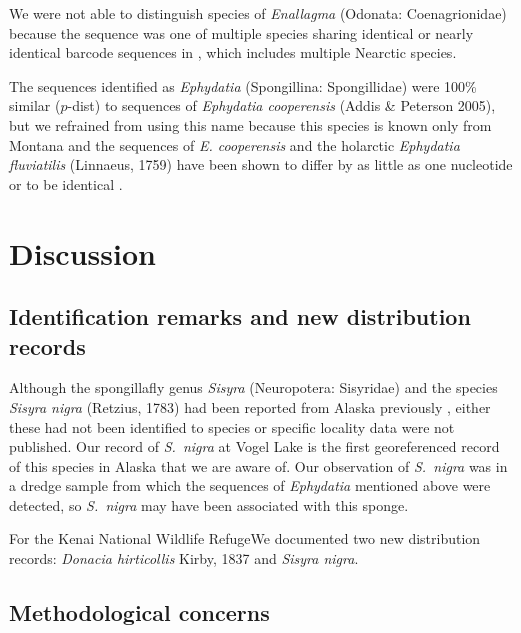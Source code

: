 \begin{multicols}{2}

We were not able to distinguish species of \textit{Enallagma} (Odonata: Coenagrionidae) because the sequence was one of multiple species sharing identical or nearly identical  barcode sequences in  , which includes multiple Nearctic species\citep{Geigeretal2021}.

The sequences identified as \textit{Ephydatia} (Spongillina: Spongillidae) were 100\% similar ($p$-dist) to sequences of \textit{Ephydatia cooperensis} (Addis \& Peterson 2005), but we refrained from using this name because this species is known only from Montana \citet{Mazzacano2008} and the  sequences of \textit{E. cooperensis} and the holarctic \textit{Ephydatia fluviatilis} (Linnaeus, 1759) have been shown to differ by as little as one nucleotide \citep{AddisPeterson2005} or to be identical \citep{Meixneretal2007}.

\section{Discussion}

\subsection{Identification remarks and new distribution records}

Although the spongillafly genus \textit{Sisyra} (Neuropotera: Sisyridae) and the species \textit{Sisyra nigra} (Retzius, 1783) had been reported from Alaska previously \citep{Bowles2006, Sikes2022}, either these had not been identified to species or specific locality data were not published. Our record of \textit{S.\ nigra} at Vogel Lake is the first georeferenced record of this species in Alaska that we are aware of. Our observation of \textit{S.\ nigra} was in a dredge sample from which the sequences of \textit{Ephydatia} mentioned above were detected, so \textit{S.\ nigra} may have been associated with this sponge. 

For the Kenai National Wildlife RefugeWe documented two new distribution records: 
\textit{Donacia hirticollis} Kirby, 1837 and 
\textit{Sisyra nigra}.

\subsection{Methodological concerns}


\end{multicols}
